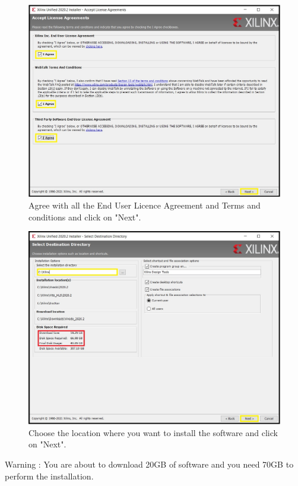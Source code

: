\begin{figure}[H]
\centering
  \includegraphics[width=0.8\linewidth]{images/VivadoInstimg013.jpg}
  \captionsetup{width=0.8\linewidth}
  \caption{Agree with all the End User Licence Agreement and Terms and conditions and click on "Next".}
  \label{fig:VivadoInstimg013}
\end{figure}

\begin{figure}[H]
\centering
  \includegraphics[width=0.8\linewidth]{images/VivadoInstimg014.jpg}
  \captionsetup{width=0.8\linewidth}
  \caption{Choose the location where you want to install the software and click on "Next".}
  \label{fig:VivadoInstimg014}
\end{figure}

Warning : You are about to download 20GB of software and you need 70GB to perform the installation.

